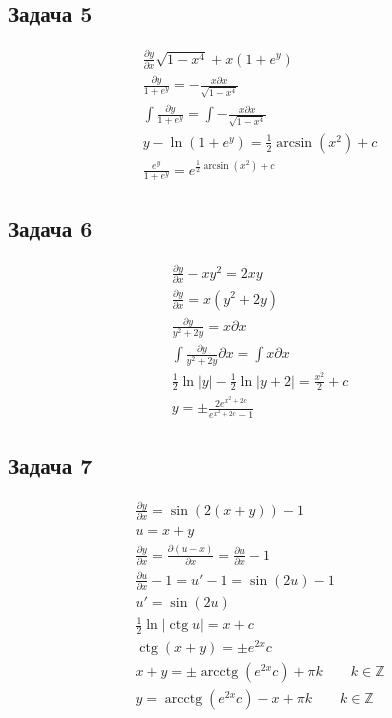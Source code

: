 \subsection*{Задача 5}
\begin{gather*}
	\frac{\partial y}{\partial x} \sqrt{1-x^4} + x(1+e^y)\\
	\frac{\partial y}{1 + e^{y}} = -\frac{x \partial x}{\sqrt{1-x^4}}\\
	\int \frac{\partial y}{1 + e^{y}} = \int -\frac{x \partial x}{\sqrt{1-x^4}}\\
	y - \ln(1+e^y) = \frac{1}{2} \arcsin(x^2) + c\\
	\frac{e^y}{1+e^y} = e^{\frac{1}{2} \arcsin(x^2)+c}
\end{gather*}

\subsection*{Задача 6}
\begin{gather*}
	\frac{\partial y}{\partial x} - xy^2 = 2xy\\
	\frac{\partial y}{\partial x} = x(y^2 + 2y)\\
	\frac{\partial y}{y^2+2y} = x \partial x\\
	\int \frac{\partial y}{y^2 + 2y} \partial x = \int x \partial x\\
	\frac{1}{2}\ln|y| - \frac{1}{2}\ln|y+2| = \frac{x^2}{2} + c\\
	y = \pm \frac{2e^{x^2+2c}}{e^{x^2+2c}-1}
\end{gather*}

\subsection*{Задача 7}
\begin{gather*}
	\frac{\partial y}{\partial x} = \sin(2(x+y)) - 1\\
	u = x+y\\
	\frac{\partial y}{\partial x} = \frac{\partial (u - x)}{\partial x} = \frac{\partial u}{\partial x} - 1\\
	\frac{\partial u}{\partial x} - 1 = u' - 1 = \sin(2u) - 1\\
	u' = \sin(2u)\\
	\frac{1}{2} \ln|\operatorname{ctg} u| = x + c\\
	\operatorname{ctg}(x+y) = \pm e^{2x}c\\
	x+y = \pm \operatorname{arcctg}(e^{2x}c) + \pi k\qquad k \in \mathbb{Z}\\
	y = \operatorname{arcctg}(e^{2x}c) - x + \pi k\qquad k \in \mathbb{Z}
\end{gather*}

